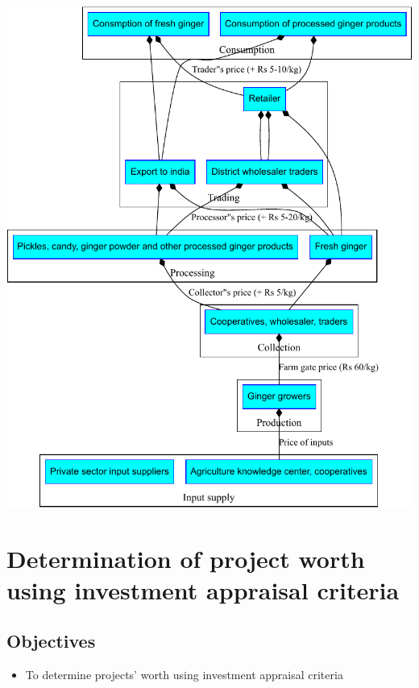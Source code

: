 \documentclass[
]{article}
\providecommand{\tightlist}{%
  \setlength{\itemsep}{0pt}\setlength{\parskip}{0pt}}
\begin{document}
\begin{center}\includegraphics[width=0.6\linewidth]{practicals_files/figure-latex/diagram-value-chain-ginger-1} \end{center}

\clearpage

\hypertarget{determination-of-project-worth-using-investment-appraisal-criteria}{%
\section{Determination of project worth using investment appraisal criteria}\label{determination-of-project-worth-using-investment-appraisal-criteria}}

\hypertarget{objectives-9}{%
\subsection*{Objectives}\label{objectives-9}}

\begin{itemize}
\tightlist
\item
  To determine projects' worth using investment appraisal criteria
\end{itemize}
\end{document}
